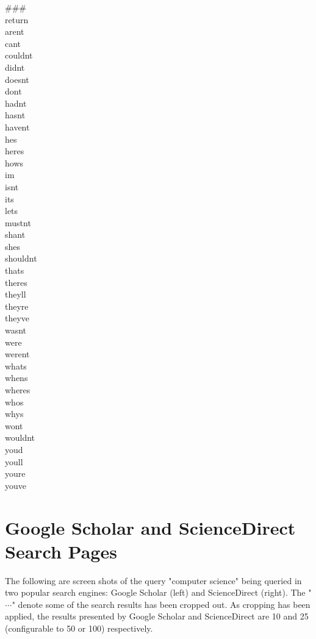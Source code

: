 \begin{appendices}
\begin{multicols}{7}
\#\#\#\\
return\\
arent\\
cant\\
couldnt\\
didnt\\
doesnt\\
dont\\
hadnt\\
hasnt\\
havent\\
hes\\
heres\\
hows\\
im\\
isnt\\
its\\
lets\\
mustnt\\
shant\\
shes\\
shouldnt\\
thats\\
theres\\
theyll\\
theyre\\
theyve\\
wasnt\\
were\\
werent\\
whats\\
whens\\
wheres\\
whos\\
whys\\
wont\\
wouldnt\\
youd\\
youll\\
youre\\
youve\\
\end{multicols}

\chapter{Google Scholar and ScienceDirect Search Pages}
\label{appendix:searcheg}
The following are screen shots of the query "computer science" being queried in two popular search engines: Google Scholar (left) and ScienceDirect (right). The "\textbf{$\cdot$$\cdot$$\cdot$}" denote some of the search results has been cropped out. As cropping has been applied, the results presented by Google Scholar and ScienceDirect are 10 and 25 (configurable to 50 or 100) respectively. \\


\end{appendices}

